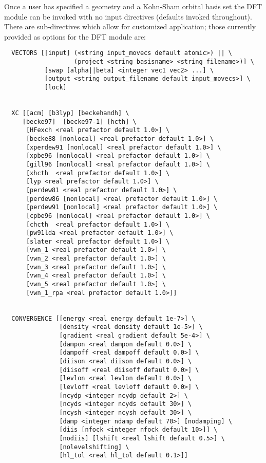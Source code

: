 Once a user has specified a geometry and a Kohn-Sham orbital basis set
the DFT module can be invoked with no input directives (defaults 
invoked throughout).  There are sub-directives which allow for 
customized application; those currently provided as options for 
the DFT module are:
\begin{verbatim}
  VECTORS [[input] (<string input_movecs default atomic>) || \
                   (project <string basisname> <string filename>)] \
           [swap [alpha||beta] <integer vec1 vec2> ...] \
           [output <string output_filename default input_movecs>] \
           [lock]


  XC [[acm] [b3lyp] [beckehandh] \
     [becke97]  [becke97-1] [hcth] \
      [HFexch <real prefactor default 1.0>] \
      [becke88 [nonlocal] <real prefactor default 1.0>] \
      [xperdew91 [nonlocal] <real prefactor default 1.0>] \
      [xpbe96 [nonlocal] <real prefactor default 1.0>] \
      [gill96 [nonlocal] <real prefactor default 1.0>] \
      [xhcth  <real prefactor default 1.0>] \
      [lyp <real prefactor default 1.0>] \
      [perdew81 <real prefactor default 1.0>] \
      [perdew86 [nonlocal] <real prefactor default 1.0>] \
      [perdew91 [nonlocal] <real prefactor default 1.0>] \
      [cpbe96 [nonlocal] <real prefactor default 1.0>] \
      [chcth  <real prefactor default 1.0>] \
      [pw91lda <real prefactor default 1.0>] \
      [slater <real prefactor default 1.0>] \
      [vwn_1 <real prefactor default 1.0>] \
      [vwn_2 <real prefactor default 1.0>] \
      [vwn_3 <real prefactor default 1.0>] \
      [vwn_4 <real prefactor default 1.0>] \
      [vwn_5 <real prefactor default 1.0>] \
      [vwn_1_rpa <real prefactor default 1.0>]]


  CONVERGENCE [[energy <real energy default 1e-7>] \
               [density <real density default 1e-5>] \
               [gradient <real gradient default 5e-4>] \
               [dampon <real dampon default 0.0>] \
               [dampoff <real dampoff default 0.0>] \
               [diison <real diison default 0.0>] \
               [diisoff <real diisoff default 0.0>] \
               [levlon <real levlon default 0.0>] \
               [levloff <real levloff default 0.0>] \
               [ncydp <integer ncydp default 2>] \
               [ncyds <integer ncyds default 30>] \
               [ncysh <integer ncysh default 30>] \
               [damp <integer ndamp default 70>] [nodamping] \
               [diis [nfock <integer nfock default 10>]] \
               [nodiis] [lshift <real lshift default 0.5>] \
               [nolevelshifting] \
               [hl_tol <real hl_tol default 0.1>]]



\end{verbatim}
